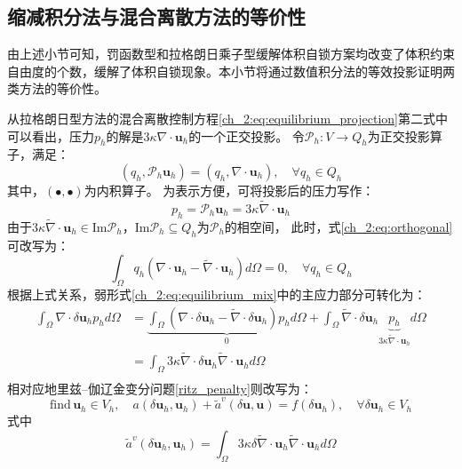 \subsection{缩减积分法与混合离散方法的等价性}
由上述小节可知，罚函数型和拉格朗日乘子型缓解体积自锁方案均改变了体积约束自由度的个数，缓解了体积自锁现象。本小节将通过数值积分法的等效投影证明两类方法的等价性。

从拉格朗日型方法的混合离散控制方程\eqref{ch_2:eq:equilibrium_projection}第二式中可以看出，压力$p_h$的解是$3\kappa \nabla \cdot \boldsymbol u_h$的一个正交投影。
令$\mathcal P_h: V\rightarrow Q_h$为正交投影算子，满足：
\begin{equation}\label{ch_2:eq:orthogonal}
    (q_h,\mathcal P_h \boldsymbol u_h) = (q_h, \nabla \cdot \boldsymbol u_h), \quad \forall q_h \in Q_h
\end{equation}
其中，$(\bullet,\bullet)$为内积算子。
为表示方便，可将投影后的压力写作：
\begin{equation}\label{ch_2:eq:pressure_projection}
p_h=\mathcal P_h \boldsymbol u_h = 3\kappa \tilde \nabla \cdot \boldsymbol u_h
\end{equation}
由于$3\kappa\tilde \nabla \cdot \boldsymbol u_h \in \mathrm{Im} \mathcal P_h$，$\mathrm{Im} \mathcal P_h \subseteq Q_h$为$\mathcal P_h$的相空间\cite{philippeg.2013}，
此时，式\eqref{ch_2:eq:orthogonal}可改写为：
\begin{equation}
    \int_\Omega q_h(\nabla \cdot \boldsymbol u_h - \tilde \nabla \cdot \boldsymbol u_h) d\Omega = 0, \quad \forall q_h \in Q_h
\end{equation}
根据上式关系，弱形式\eqref{ch_2:eq:equilibrium_mix}中的主应力部分可转化为：
\begin{equation}\label{projection_mixed}
    \begin{split}
        \int_\Omega \nabla \cdot \delta \boldsymbol u_h p_h d\Omega &= \underbrace{\int_\Omega (\nabla \cdot \delta  \boldsymbol u_h - \tilde \nabla \cdot \delta \boldsymbol u_h) p_h d\Omega}_0 + \int_\Omega \tilde \nabla \cdot \delta \boldsymbol u_h \underbrace{p_h}_{3\kappa\tilde \nabla \cdot \boldsymbol u_h} d\Omega \\
        &= \int_\Omega 3\kappa \tilde \nabla \cdot \delta \boldsymbol u_h \tilde \nabla \cdot \boldsymbol u_h d\Omega \\
    \end{split}
\end{equation}
相对应地里兹--伽辽金变分问题\eqref{ritz_penalty}则改写为：
\begin{equation}\label{ch_2:eq:ritz_mix}
    \text{find}\, \boldsymbol u_h \in V_h, \quad
    a(\delta \boldsymbol u_h, \boldsymbol u_h) + \tilde a^v(\delta \boldsymbol u, \boldsymbol u) =
    f(\delta \boldsymbol u_h),
    \quad \forall \delta \boldsymbol u_h \in V_h
\end{equation}
式中
\begin{equation}
    \tilde a^v(\delta \boldsymbol u_h, \boldsymbol u_h) = 
    \int_\Omega 3\kappa \delta \tilde \nabla\cdot \boldsymbol u_h \tilde \nabla \cdot \boldsymbol u_h d\Omega
\end{equation}

